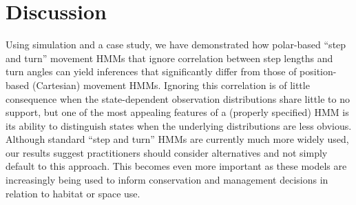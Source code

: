 \documentclass[12pt]{article}\usepackage[]{graphicx}\usepackage[]{xcolor}
\begin{document}
\section{Discussion}
Using simulation and a case study, we have demonstrated how polar-based ``step and turn'' movement HMMs that ignore correlation between step lengths and turn angles can yield inferences that significantly differ from those of position-based (Cartesian) movement HMMs. Ignoring this correlation is of little consequence when the state-dependent observation distributions share little to no support, but one of the most appealing features of a (properly specified) HMM is its ability to distinguish states when the underlying distributions are less obvious. Although standard ``step and turn'' HMMs are currently much more widely used, our results suggest practitioners should consider alternatives and not simply default to this approach. This becomes even more important as these models are increasingly being used to inform conservation and management decisions in relation to habitat or space use.
\end{document}
